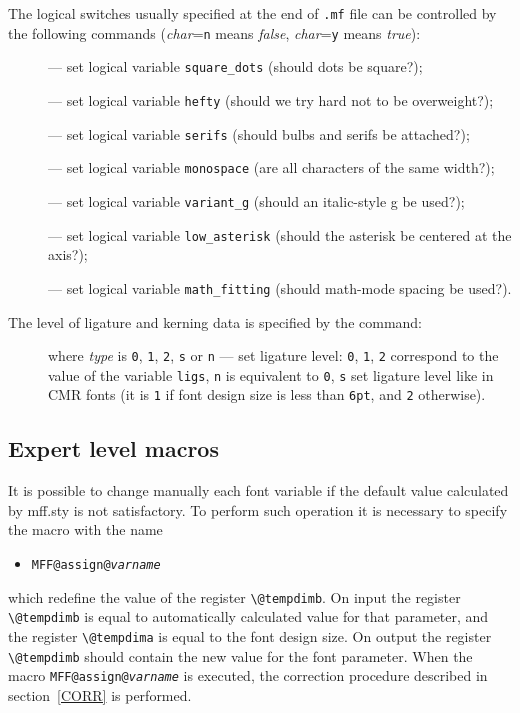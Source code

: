 The logical switches usually specified at the end of {\tt *.mf}
file can be controlled by the following commands
({\sl char}={\tt n} means {\em false}, {\sl char}={\tt y} means {\em true}):
\begin{description}
\item[] --- set logical variable
    {\tt square\_dots} (should dots be square?);
\item[] --- set logical variable
    {\tt hefty} (should we try hard not to be overweight?);
\item[] --- set logical variable
    {\tt serifs} (should bulbs and se\-rifs be attached?);
\item[] --- set logical variable
    {\tt monospace} (are all characters of the same width?);
\item[] --- set logical variable
    {\tt variant\_g} (should an italic-style g be used?);
\item[] --- set logical variable
    {\tt low\_asterisk} (should the asterisk be centered at the axis?);
\item[] --- set logical variable
    {\tt math\_fitting} (should math-mode spacing be used?).
\end{description}
The level of ligature and kerning data is specified by the command:
\begin{description}
\item[] where {\em type} is
     {\tt 0}, {\tt 1}, {\tt 2}, {\tt s} or {\tt n} --- set ligature level:
     {\tt 0}, {\tt 1}, {\tt 2}  correspond to the value of the variable {\tt ligs},
     {\tt n} is equivalent to {\tt 0}, {\tt s} set ligature level like
     in CMR fonts (it is {\tt 1} if font design size is less than {\tt 6pt},
     and {\tt 2} otherwise).
\end{description}

\subsection{Expert level macros\label{EXPERT}}

It is possible to change manually each font variable
if the default value calculated by {\sc mff.sty} is
not satisfactory. To perform such operation it is necessary
to specify the macro with the name
\begin{itemize}
\item[] {\tt \bs{}MFF@assign@{\em varname}}
\end{itemize}
which redefine the value of the register \verb?\@tempdimb?.
On input the register \verb?\@tempdimb?
is equal to automatically calculated value for that parameter,
and the register \verb?\@tempdima? is equal to the font design size.
On output the register \verb?\@tempdimb? should contain
the new value for the font parameter.
When the macro {\tt\bs{}MFF@assign@{\em varname}} is executed,
the correction procedure described in section~\ref{CORR}
is performed.

